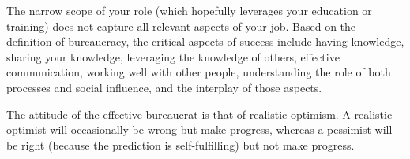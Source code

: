 
The narrow scope of your role (which hopefully leverages your education or training) does not capture all relevant aspects of your job. 
Based on the definition of \gls{bureaucracy}, the critical aspects of success include having knowledge, sharing your knowledge, leveraging the knowledge of others, effective communication, working well with other people, understanding the role of both processes and social influence, and the interplay of those aspects. 


The attitude of the effective bureaucrat  is that of realistic optimism. A realistic optimist will occasionally be wrong but make progress, whereas a pessimist will be right (because the prediction is self-fulfilling) but not make progress.
